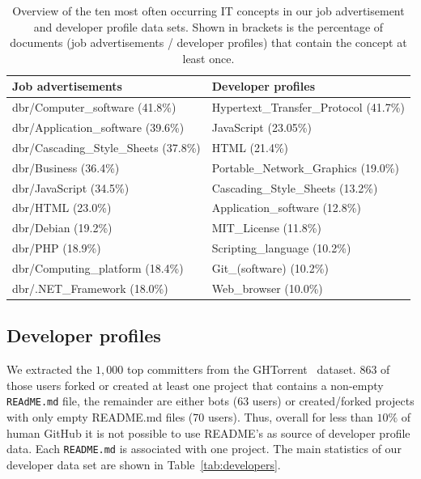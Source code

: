 \documentclass[conference]{IEEEtran}
\begin{document}
\begin{table}
\centering
\footnotesize
\begin{tabular}{ll}
\toprule
\textbf{Job advertisements}	& \textbf{Developer profiles}\\
\midrule
dbr/Computer\_software (41.8\%) 			& Hypertext\_Transfer\_Protocol (41.7\%) \\
dbr/Application\_software (39.6\%)			& JavaScript (23.05\%) \\
dbr/Cascading\_Style\_Sheets (37.8\%)	& HTML (21.4\%) \\
dbr/Business (36.4\%)								& Portable\_Network\_Graphics (19.0\%)\\
dbr/JavaScript (34.5\%)							& Cascading\_Style\_Sheets (13.2\%)\\
dbr/HTML (23.0\%)									& Application\_software (12.8\%) \\
dbr/Debian (19.2\%)								& MIT\_License (11.8\%) \\
dbr/PHP (18.9\%)										& Scripting\_language (10.2\%) \\
dbr/Computing\_platform (18.4\%)		& Git\_(software) (10.2\%) \\
dbr/.NET\_Framework (18.0\%)				& Web\_browser (10.0\%)\\
\bottomrule
\end{tabular}
\caption{Overview of the ten most often occurring IT concepts in our job advertisement and developer profile data sets. Shown in brackets is the percentage of documents (job advertisements / developer profiles) that contain the concept at least once.}
\label{tab:top10}
\end{table}

\subsection{Developer profiles}

We extracted the $1,000$ top committers from the GHTorrent~\cite{Gousi13} dataset. 863 of those users forked or created at least one project that contains a non-empty \texttt{REAdME.md} file, the remainder are either bots (63 users) or created/forked projects with only empty README.md files (70 users). Thus, overall for less than $10\%$ of human GitHub it is not possible to use README's as source of developer profile data. Each \texttt{README.md} is associated with one project. The main statistics of our developer data set are shown in Table~\ref{tab:developers}. 
\end{document}
